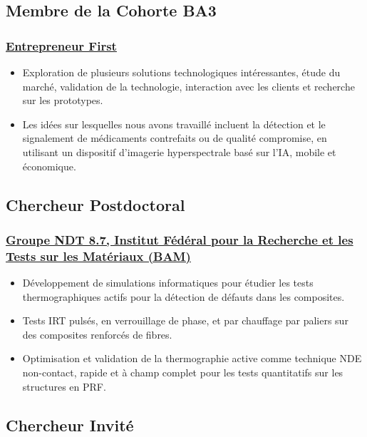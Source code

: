 \documentclass{my_cv}%
\begin{document}
\subsection{Membre de la Cohorte BA3}
\subsubsection{\href{https://www.joinef.com/}{Entrepreneur First}}
\begin{itemize}[leftmargin=0.15in]
\setlength\itemsep{-0.1em}
\color{mygray}
\item Exploration de plusieurs solutions technologiques intéressantes, étude du marché, validation de la technologie, interaction avec les clients et recherche sur les prototypes.
\item Les idées sur lesquelles nous avons travaillé incluent la détection et le signalement de médicaments contrefaits ou de qualité compromise, en utilisant un dispositif d'imagerie hyperspectrale basé sur l'IA, mobile et économique.
\end{itemize}
{\color{mygray1} \hdashrule[0.1ex]{18.8cm}{0.2mm}{1mm}}
\subsection{Chercheur Postdoctoral}
\subsubsection{\href{https://www.bam.de/Navigation/DE/Home/home.html}{Groupe NDT 8.7, Institut Fédéral pour la Recherche et les Tests sur les Matériaux (BAM)}}
\begin{itemize}[leftmargin=0.15in]
\setlength\itemsep{-0.1em}
\color{mygray}
\item Développement de simulations informatiques pour étudier les tests thermographiques actifs pour la détection de défauts dans les composites.
\item Tests IRT pulsés, en verrouillage de phase, et par chauffage par paliers sur des composites renforcés de fibres.
\item Optimisation et validation de la thermographie active comme technique NDE non-contact, rapide et à champ complet pour les tests quantitatifs sur les structures en PRF.
\end{itemize}
{\color{mygray1} \hdashrule[0.1ex]{18.8cm}{0.2mm}{1mm}}
\subsection{Chercheur Invité}
\end{document}
